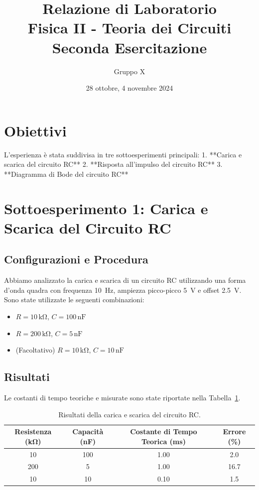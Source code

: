 \documentclass[a4paper,11pt]{article}
\title{Relazione di Laboratorio\\Fisica II - Teoria dei Circuiti\\Seconda Esercitazione}
\author{Gruppo X}
\date{28 ottobre, 4 novembre 2024}
\begin{document}
\maketitle

\section*{Obiettivi}
L'esperienza è stata suddivisa in tre sottoesperimenti principali:  
1. **Carica e scarica del circuito RC**  
2. **Risposta all'impulso del circuito RC**  
3. **Diagramma di Bode del circuito RC**


\section{Sottoesperimento 1: Carica e Scarica del Circuito RC}
\subsection*{Configurazioni e Procedura}
Abbiamo analizzato la carica e scarica di un circuito RC utilizzando una forma d'onda quadra con frequenza \SI{10}{\hertz}, ampiezza picco-picco \SI{5}{\volt} e offset \SI{2.5}{\volt}. Sono state utilizzate le seguenti combinazioni:
\begin{itemize}
    \item \( R = 10 \, \mathrm{k\Omega} \), \( C = 100 \, \mathrm{nF} \)
    \item \( R = 200 \, \mathrm{k\Omega} \), \( C = 5 \, \mathrm{nF} \)
    \item (Facoltativo) \( R = 10 \, \mathrm{k\Omega} \), \( C = 10 \, \mathrm{nF} \)
\end{itemize}

\subsection*{Risultati}
Le costanti di tempo teoriche e misurate sono state riportate nella Tabella~\ref{tab:rc_charge_discharge}.
\begin{table}[H]
\centering
\begin{tabular}{|c|c|c|c|}
\hline
\textbf{Resistenza (\si{\kilo\ohm})} & \textbf{Capacità (\si{\nano\farad})} & \textbf{Costante di Tempo Teorica (\si{\milli\second})} & \textbf{Errore (\%)} \\ \hline
10 & 100 & 1.00 & 2.0 \\ \hline
200 & 5 & 1.00 & 16.7 \\ \hline
10 & 10 & 0.10 & 1.5 \\ \hline
\end{tabular}
\caption{Risultati della carica e scarica del circuito RC.}
\label{tab:rc_charge_discharge}
\end{table}
\end{document}
